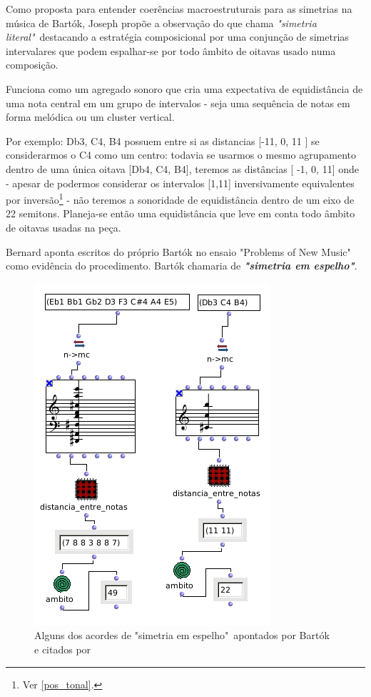 \documentclass[
	12pt,				%
	openright,			%
	twoside,			%
	a4paper,			%
	english,			%
	french,				%
	spanish,			%
	brazil				%
	]{abntex2}
\begin{document}
Como proposta para entender coerências macroestruturais para as simetrias na música de Bartók, Joseph  propõe a observação do que chama \textit{"simetria literal"}\ destacando a estratégia composicional por uma conjunção de simetrias intervalares que podem espalhar-se por todo âmbito de oitavas usado numa composição.  

Funciona como um  agregado sonoro que cria uma expectativa de equidistância de uma nota central em um grupo de intervalos - seja uma sequência de notas em forma melódica ou um cluster vertical. 

Por exemplo: { Db3, C4, B4} possuem entre si as distancias [-11, 0, 11 ] se considerarmos o C4 como um centro: todavia se usarmos o mesmo agrupamento dentro de uma única oitava [Db4, C4, B4], teremos as distâncias [ -1, 0, 11] onde - apesar de podermos considerar os intervalos [1,11] inversivamente equivalentes por inversão\footnote{Ver \autoref{pos_tonal}.} - não teremos a sonoridade de equidistância dentro de um eixo de 22 semitons. Planeja-se então uma equidistância que leve em conta todo âmbito de oitavas usadas na peça.

Bernard aponta escritos do próprio Bartók no ensaio "Problems of New Music" como evidência do procedimento. Bartók chamaria de \textit{\textbf{"simetria em espelho"}}.


\begin{figure}[!h]
	\caption{\label{fig_simetrialiteral} Alguns dos acordes de "simetria em espelho"\ apontados por Bartók e citados por }
	\begin{center}
	    \includegraphics[scale=0.6]{axis/simetria_literal.png}
	\end{center}
\end{figure}
\end{document}
